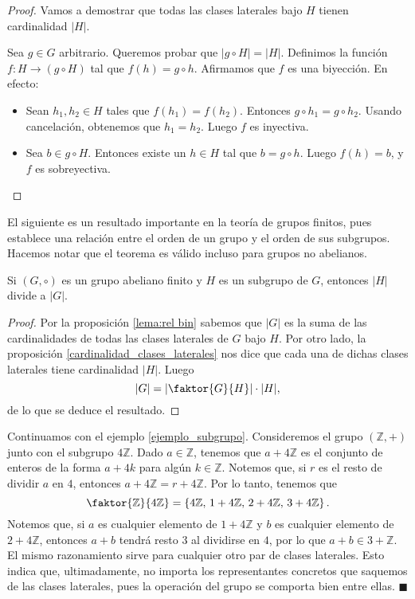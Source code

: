 \begin{proof}
Vamos a demostrar que todas las clases laterales bajo $H$ tienen cardinalidad $|H|$.

Sea $g \in G$ arbitrario. Queremos probar que $|g \circ H| = |H|$. Definimos la función $f\colon H \rightarrow (g \circ H)$ tal que $f(h) = g \circ h$. Afirmamos que $f$ es una biyección. En efecto: 
\begin{itemize}
\item Sean $h_1, h_2 \in H$ tales que $f(h_1) = f(h_2)$. Entonces $g \circ h_1 = g \circ h_2$. Usando cancelación, obtenemos que $h_1 = h_2$. Luego $f$ es inyectiva.
\item Sea $b \in g \circ H$. Entonces existe un $h \in H$ tal que $b = g \circ h$. Luego $f(h) = b$, y $f$ es sobreyectiva.
\end{itemize}
\end{proof}


El siguiente es un resultado importante en la teoría de grupos finitos, pues establece una relación entre el orden de un grupo y el orden de sus subgrupos. Hacemos notar que el teorema es válido incluso para grupos no abelianos. 

\begin{theorem}[Lagrange]
\label{teo:lagrange}
Si $(G, \circ)$ es un grupo abeliano finito y $H$ es un subgrupo de $G$, entonces $|H|$ divide a $|G|$.
\end{theorem}

\begin{proof}
Por la proposición \ref{lema:rel bin} sabemos que $|G|$ es la suma de las cardinalidades de todas las clases laterales de $G$ bajo $H$. Por otro lado, la proposición \ref{cardinalidad_clases_laterales} nos dice que cada una de dichas clases laterales tiene cardinalidad $|H|$. Luego $$|G| = \left| \faktor{G}{H}\right| \cdot |H|,$$ de lo que se deduce el resultado. 
\end{proof}


\begin{example} \label{ejemplo_clases_laterales}
Continuamos con el ejemplo \ref{ejemplo_subgrupo}. Consideremos el grupo $(\mathbb{Z}, +)$ junto con el subgrupo $4\mathbb{Z}$. Dado $a \in \mathbb{Z}$, tenemos que $a + 4\mathbb{Z}$ es el conjunto de enteros de la forma $a + 4k$ para algún $k \in \mathbb{Z}$. Notemos que, si $r$ es el resto de dividir $a$ en $4$, entonces $a + 4\mathbb{Z} = r + 4\mathbb{Z}$. Por lo tanto, tenemos que
$$\faktor{\mathbb{Z}}{4\mathbb{Z}} = \left\{ 4\mathbb{Z},\, 1+4\mathbb{Z},\, 2+4\mathbb{Z},\, 3+4\mathbb{Z}\right\}.$$
Notemos que, si $a$ es cualquier elemento de $1+4\mathbb{Z}$ y $b$ es cualquier elemento de $2+4\mathbb{Z}$, entonces $a+b$ tendrá resto $3$ al dividirse en $4$, por lo que $a+b \in 3+\mathbb{Z}$. El mismo razonamiento sirve para cualquier otro par de clases laterales. Esto indica que, ultimadamente, no importa los representantes concretos que saquemos de las clases laterales, pues la operación del grupo se comporta bien entre ellas.  
\hfill$\blacksquare$
\end{example}

